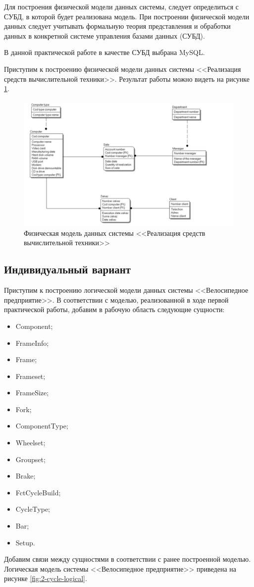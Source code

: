 \documentclass[a4paper,14pt]{extarticle}
\newcommand{\individual}{Индивидуальный вариант~}
\begin{document}
Для построения физической модели данных системы, следует определиться с СУБД, в которой будет реализована модель. При построении физической модели данных следует учитывать формальную теория представления и обработки данных в конкретной системе управления базами данных (СУБД).

В данной практической работе в качестве СУБД выбрана MySQL.

Приступим к построению физической модели данных системы <<Реализация средств вычислительной техники>>. Результат работы можно видеть на рисунке \ref{fig:2-phisical-model}.

\begin{figure}[h!]
	\centering
	\includegraphics[width=0.7\linewidth]{images/2-phisical-model}
	\caption{Физическая модель данных системы <<Реализация средств вычислительной техники>>}
	\label{fig:2-phisical-model}
\end{figure}
\newpage
\subsection{\individual}
Приступим к построению логической модели данных системы <<Велосипедное предприятие>>. 
В соответствии с моделью, реализованной в ходе первой практической работы, добавим в рабочую область следующие сущности:
\begin{itemize}
	\item Component;
	\item FrameInfo;
	\item Frame;
	\item Frameset;
	\item FrameSize;
	\item Fork;
	\item ComponentType;
	\item Wheelset;
	\item Groupset;
	\item Brake;
	\item FctCycleBuild;
	\item CycleType;
	\item Bar;
	\item Setup.
\end{itemize}
Добавим связи между сущностями в соответствии с ранее построенной моделью. Логическая модель системы <<Велосипедное предприятие>> приведена на рисунке \ref{fig:2-cycle-logical}.
\end{document}

